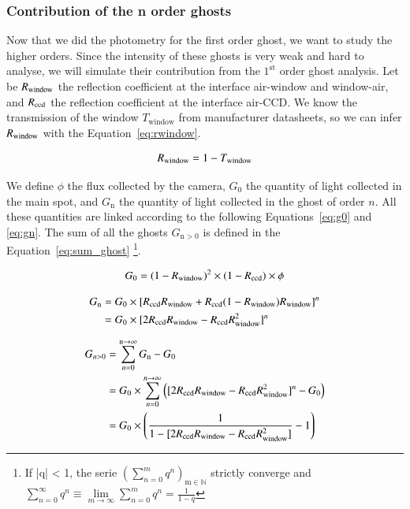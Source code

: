  \subsubsection{Contribution of the n order ghosts}

 Now that we did the photometry for the first order ghost, we want to study the higher orders. Since the intensity of these ghosts is very weak and hard to analyse, we will simulate their contribution from the $1^{\mathrm{st}}$ order ghost analysis. Let be $R_{\mathrm{window}}$ the reflection coefficient at the interface air-window and window-air, and $R_{\mathrm{ccd}}$ the reflection coefficient at the interface air-CCD. We know the transmission of the window $T_\mathrm{window}$ from manufacturer datasheets, so we can infer $R_{\mathrm{window}}$ with the Equation~\ref{eq:rwindow}.
 
\begin{equation}
    R_{\mathrm{window}} = 1 - T_\mathrm{window}
    \label{eq:rwindow}
\end{equation}

 
 We define $\phi$ the flux collected by the camera, $G_0$ the quantity of light collected in the main spot, and $G_\mathrm{n}$ the quantity of light collected in the ghost of order $n$. All these quantities are linked according to the following Equations~\ref{eq:g0} and \ref{eq:gn}. The sum of all the ghosts $G_{\mathrm{n>0}}$ is defined in the Equation~\ref{eq:sum_ghost}
 \footnote{If |q| < 1, the serie $\left( \sum_{n=0}^{m} q^n \right)_{\mathrm{m \in \mathbb{N}}}$ strictly converge and \\ $\sum_{n=0}^{\infty} q^n \equiv \lim\limits_{m \rightarrow \infty} \sum_{n=0}^{m} q^n = \frac{1}{1-q}$}. %

 \begin{equation}
     G_0 = (1-R_{\mathrm{window}})^{2} \times (1-R_{\mathrm{ccd}}) \times \phi
     \label{eq:g0}
 \end{equation}

\begin{equation}
\begin{aligned}
    G_\mathrm{n} & = G_{0} \times [R_{\mathrm{ccd}} R_{\mathrm{window}} + R_{\mathrm{ccd}}(1-R_{\mathrm{window}})R_{\mathrm{window}}]^{n} \\
    & = G_{0} \times [2 R_{\mathrm{ccd}} R_{\mathrm{window}} - R_{\mathrm{ccd}} R_{\mathrm{window}}^{2}] ^{n} \\
     \label{eq:gn}
\end{aligned}
\end{equation}

 \begin{equation}
 \begin{aligned}
     G_{n>0} & = \sum_{n=0}^{\mathrm{n} \rightarrow \infty} G_\mathrm{n} - G_0 \\
     & = G_0 \times \sum_{n=0}^{n \rightarrow \infty} \left( [2 R_{\mathrm{ccd}} R_{\mathrm{window}} - R_{\mathrm{ccd}} R_{\mathrm{window}}^{2}] ^{n} - G_0 \right)\\
     & = G_0 \times\left( \frac{1}{1- [2 R_{\mathrm{ccd}} R_{\mathrm{window}} - R_{\mathrm{ccd}} R_{\mathrm{window}}^{2}]} - 1\right)
     \label{eq:sum_ghost}
 \end{aligned}
 \end{equation}


